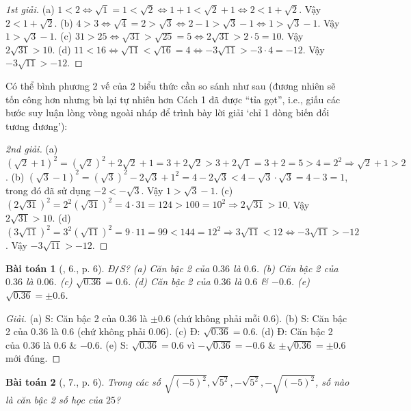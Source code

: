 \documentclass{article}
\newtheorem{baitoan}{Bài toán}
\begin{document}
\begin{proof}[1st giải]
	(a) $1 < 2\Leftrightarrow\sqrt{1} = 1 < \sqrt{2}\Leftrightarrow1 + 1 < \sqrt{2} + 1\Leftrightarrow 2 < 1 + \sqrt{2}$. Vậy $2 < 1 + \sqrt{2}$. (b) $4 > 3\Leftrightarrow\sqrt{4} = 2 > \sqrt{3}\Leftrightarrow2 - 1 > \sqrt{3} - 1\Leftrightarrow1 > \sqrt{3} - 1$. Vậy $1 > \sqrt{3} - 1$. (c) $31 > 25\Leftrightarrow\sqrt{31} > \sqrt{25} = 5\Leftrightarrow2\sqrt{31} > 2\cdot5 = 10$. Vậy $2\sqrt{31} > 10$. (d) $11 < 16\Leftrightarrow\sqrt{11} < \sqrt{16} = 4\Leftrightarrow-3\sqrt{11} > -3\cdot4 = -12$. Vậy $-3\sqrt{11} > -12$.
\end{proof}
Có thể bình phương 2 vế của 2 biểu thức cần so sánh như sau (đương nhiên sẽ tốn công hơn nhưng bù lại tự nhiên hơn Cách 1 đã được ``tỉa gọt'', i.e., giấu các bước suy luận lòng vòng ngoài nháp để trình bày lời giải `chỉ 1 dòng biến đổi tương đương'):
\begin{proof}[2nd giải]
	(a) $(\sqrt{2} + 1)^2 = (\sqrt{2})^2 + 2\sqrt{2} + 1 = 3 + 2\sqrt{2} > 3 + 2\sqrt{1} = 3 + 2 = 5 > 4 = 2^2\Rightarrow\sqrt{2} + 1 > 2$. (b) $(\sqrt{3} - 1)^2 = (\sqrt{3})^2 - 2\sqrt{3} + 1^2 = 4 - 2\sqrt{3} < 4 - \sqrt{3}\cdot\sqrt{3} = 4 - 3 = 1$, trong đó đã sử dụng $-2 < -\sqrt{3}$. Vậy $1 > \sqrt{3} - 1$. (c) $(2\sqrt{31})^2 = 2^2(\sqrt{31})^2 = 4\cdot31 = 124 > 100 = 10^2\Rightarrow2\sqrt{31} > 10$. Vậy $2\sqrt{31} > 10$. (d) $(3\sqrt{11})^2 = 3^2(\sqrt{11})^2 = 9\cdot11 = 99 < 144 = 12^2\Rightarrow3\sqrt{11} < 12\Leftrightarrow-3\sqrt{11} > -12$. Vậy $-3\sqrt{11} > -12$.
\end{proof}

\begin{baitoan}[\cite{SBT_Toan_9_tap_1}, 6., p. 6]
	\emph{Đ\texttt{/}S?} (a) Căn bậc 2 của $0.36$ là $0.6$. (b) Căn bậc 2 của $0.36$ là $0.06$. (c) $\sqrt{0.36} = 0.6$. (d) Căn bậc 2 của $0.36$ là $0.6$ \& $-0.6$. (e) $\sqrt{0.36} = \pm0.6$.
\end{baitoan}

\begin{proof}[Giải]
	(a) S: Căn bậc 2 của 0.36 là $\pm0.6$ (chứ không phải mỗi 0.6). (b) S: Căn bậc 2 của 0.36 là 0.6 (chứ không phải 0.06). (c) Đ: $\sqrt{0.36} = 0.6$. (d) Đ: Căn bậc 2 của $0.36$ là $0.6$ \& $-0.6$. (e) S: $\sqrt{0.36} = 0.6$ vì $-\sqrt{0.36} = -0.6$ \& $\pm\sqrt{0.36} = \pm0.6$ mới đúng.
\end{proof}

\begin{baitoan}[\cite{SBT_Toan_9_tap_1}, 7., p. 6]
	Trong các số $\sqrt{(-5)^2},\sqrt{5^2},-\sqrt{5^2},-\sqrt{(-5)^2}$, số nào là căn bậc 2 số học của $25$?
\end{baitoan}
\end{document}
